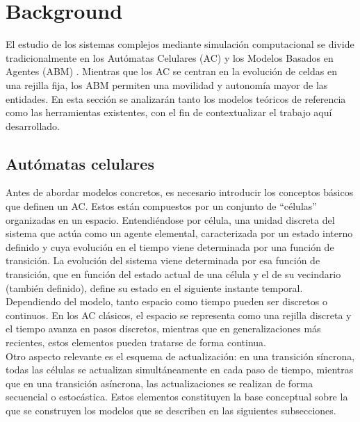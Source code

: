\documentclass[runningheads]{llncs}
\begin{document}
\section{Background}
\label{sec:background}
El estudio de los sistemas complejos mediante simulación computacional se divide tradicionalmente en los Autómatas Celulares (AC) \cite{ref_ca} y los Modelos Basados en Agentes (ABM) \cite{ref_abm}. Mientras que los AC se centran en la evolución de celdas en una rejilla fija, los ABM \cite{ref_abm} permiten una movilidad y autonomía mayor de las entidades. En esta sección se analizarán tanto los modelos teóricos de referencia como las herramientas existentes, con el fin de contextualizar el trabajo aquí desarrollado.

\subsection{Autómatas celulares}
Antes de abordar modelos concretos, es necesario introducir los conceptos básicos que definen un AC. Estos están compuestos por un conjunto de “células” organizadas en un espacio. Entendiéndose por célula, una unidad discreta del sistema que actúa como un agente elemental, caracterizada por un estado interno definido y cuya evolución en el tiempo viene determinada por una función de transición. La evolución del sistema viene determinada por esa función de transición, que en función del estado actual de una célula y el de su vecindario (también definido), define su estado en el siguiente instante temporal.\\

Dependiendo del modelo, tanto espacio como tiempo pueden ser discretos o continuos. En los AC clásicos, el espacio se representa como una rejilla discreta y el tiempo avanza en pasos discretos, mientras que en generalizaciones más recientes, estos elementos pueden tratarse de forma continua.\\

Otro aspecto relevante es el esquema de actualización: en una transición síncrona, todas las células se actualizan simultáneamente en cada paso de tiempo, mientras que en una transición asíncrona, las actualizaciones se realizan de forma secuencial o estocástica. Estos elementos constituyen la base conceptual sobre la que se construyen los modelos que se describen en las siguientes subsecciones.
\end{document}

